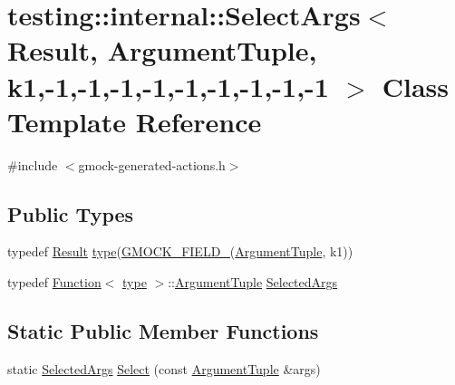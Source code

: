 \hypertarget{classtesting_1_1internal_1_1_select_args_3_01_result_00_01_argument_tuple_00_01k1_00-1_00-1_00-16ae4dde9341810fff5dd4b06d1d121a8}{}\section{testing\+:\+:internal\+:\+:Select\+Args$<$ Result, Argument\+Tuple, k1,-\/1,-\/1,-\/1,-\/1,-\/1,-\/1,-\/1,-\/1,-\/1 $>$ Class Template Reference}
\label{classtesting_1_1internal_1_1_select_args_3_01_result_00_01_argument_tuple_00_01k1_00-1_00-1_00-16ae4dde9341810fff5dd4b06d1d121a8}


{\ttfamily \#include $<$gmock-\/generated-\/actions.\+h$>$}

\subsection*{Public Types}
\begin{DoxyCompactItemize}
\item 
typedef \hyperlink{typedefs__d_8js_a28287671eaf7406afd604bd055ba4066}{Result} \hyperlink{classtesting_1_1internal_1_1_select_args_3_01_result_00_01_argument_tuple_00_01k1_00-1_00-1_00-16ae4dde9341810fff5dd4b06d1d121a8_a346a4dc38ca4782a5d17ef3a96a5dc61}{type}(\hyperlink{gmock-generated-actions_8h_a6eb3ce92b0613603057a20ec9e593317}{G\+M\+O\+C\+K\+\_\+\+F\+I\+E\+L\+D\+\_\+}(\hyperlink{typedefs__d_8js_a396b2bdc7ef45f482a7e9254b15c3c01}{Argument\+Tuple}, k1))
\item 
typedef \hyperlink{structtesting_1_1internal_1_1_function}{Function}$<$ \hyperlink{classtesting_1_1internal_1_1_select_args_3_01_result_00_01_argument_tuple_00_01k1_00-1_00-1_00-16ae4dde9341810fff5dd4b06d1d121a8_a346a4dc38ca4782a5d17ef3a96a5dc61}{type} $>$\+::\hyperlink{typedefs__d_8js_a396b2bdc7ef45f482a7e9254b15c3c01}{Argument\+Tuple} \hyperlink{classtesting_1_1internal_1_1_select_args_3_01_result_00_01_argument_tuple_00_01k1_00-1_00-1_00-16ae4dde9341810fff5dd4b06d1d121a8_a11dba88063a9b50ec965a42b1f6892c9}{Selected\+Args}
\end{DoxyCompactItemize}
\subsection*{Static Public Member Functions}
\begin{DoxyCompactItemize}
\item 
static \hyperlink{classtesting_1_1internal_1_1_select_args_3_01_result_00_01_argument_tuple_00_01k1_00-1_00-1_00-16ae4dde9341810fff5dd4b06d1d121a8_a11dba88063a9b50ec965a42b1f6892c9}{Selected\+Args} \hyperlink{classtesting_1_1internal_1_1_select_args_3_01_result_00_01_argument_tuple_00_01k1_00-1_00-1_00-16ae4dde9341810fff5dd4b06d1d121a8_aee32b2a3be7b93aa95ab40c455cc9184}{Select} (const \hyperlink{typedefs__d_8js_a396b2bdc7ef45f482a7e9254b15c3c01}{Argument\+Tuple} \&args)
\end{DoxyCompactItemize}


